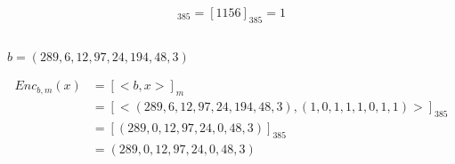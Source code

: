 \documentclass{../crypto}
\begin{document}
\begin{align*}
   [17 \cdot 68]_{385} = [1156]_{385} = 1
\end{align*}

\subsection{}

$b = (289, 6, 12, 97, 24, 194, 48, 3)$

\begin{align*}
   Enc_{b,m}(x)  & = [<b,x>]_m                                                            \\
                 & =  [<(289, 6, 12, 97, 24, 194, 48, 3),(1, 0, 1, 1, 1, 0, 1, 1)>]_{385} \\
                 & =  [(289, 0, 12, 97, 24, 0, 48, 3)]_{385}                              \\
                 & =  (289, 0, 12, 97, 24, 0, 48, 3)
\end{align*}

\subsection{}
\end{document}
